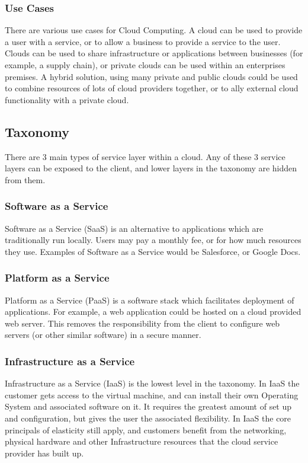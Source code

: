 \documentclass{article}
\begin{document}
\subsubsection{Use Cases}
There are various use cases for Cloud Computing. A cloud can be used to provide a user with a service, or to allow a business to provide a service to the user. Clouds can be used to share infrastructure or applications between businesses (for example, a supply chain), or private clouds can be used within an enterprises premises. A hybrid solution, using many private and public clouds could be used to combine resources of lots of cloud providers together, or to ally external cloud functionality with a private cloud.

\subsection{Taxonomy}
There are 3 main types of service layer within a cloud. Any of these 3 service layers can be exposed to the client, and lower layers in the taxonomy are hidden from them.

\subsubsection{Software as a Service}
Software as a Service (SaaS) is an alternative to applications which are traditionally run locally. Users may pay a monthly fee, or for how much resources they use. Examples of Software as a Service would be Salesforce, or Google Docs.

\subsubsection{Platform as a Service}
Platform as a Service (PaaS) is a software stack which facilitates deployment of applications. For example, a web application could be hosted on a cloud provided web server. This removes the responsibility from the client to configure web servers (or other similar software) in a secure manner.

\subsubsection{Infrastructure as a Service}
Infrastructure as a Service (IaaS) is the lowest level in the taxonomy. In IaaS the customer gets access to the virtual machine, and can install their own Operating System and associated software on it. It requires the greatest amount of set up and configuration, but gives the user the associated flexibility. In IaaS the core principals of elasticity still apply, and customers benefit from the networking, physical hardware and other Infrastructure resources that the cloud service provider has built up. 
\end{document}
